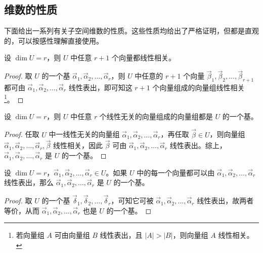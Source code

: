 \subsection{维数的性质}

下面给出一系列有关子空间维数的性质。这些性质均给出了严格证明，但都是直观的，可以按感性理解直接使用。

\begin{theorem}
	设 $\dim U = r$，则 $U$ 中任意 $r + 1$ 个向量都线性相关。
\end{theorem}

\begin{proof}
	取 $U$ 的一个基 $\vec \alpha_1, \vec \alpha_2, \ldots, \vec \alpha_r$，则 $U$ 中任意的 $r + 1$ 个向量 $\vec \beta_1, \vec \beta_2, \ldots, \vec \beta_{r + 1}$ 都可由 $\vec \alpha_1, \vec \alpha_2, \ldots, \vec \alpha_r$ 线性表出，即可知这 $r + 1$ 个向量组成的向量组线性相关\footnote{若向量组 $A$ 可由向量组 $B$ 线性表出，且 $|A| > |B|$，则向量组 $A$ 线性相关。}。
\end{proof}

\begin{theorem}
	设 $\dim U = r$，则 $U$ 中任意 $r$ 个线性无关的向量组成的向量组都是 $U$ 的一个基。
\end{theorem}

\begin{proof}
	任取 $U$ 中一线性无关的向量组 $\vec \alpha_1, \vec \alpha_2, \ldots, \vec \alpha_r$，再任取 $\vec \beta \in U$，则向量组 $\vec \alpha_1, \vec \alpha_2, \ldots, \vec \alpha_r, \vec \beta$ 线性相关，因此 $\vec \beta$ 可由 $\vec \alpha_1, \vec \alpha_2, \ldots, \vec \alpha_r$ 线性表出。综上， $\vec \alpha_1, \vec \alpha_2, \ldots, \vec \alpha_r$ 是 $U$ 的一个基。
\end{proof}

\begin{theorem}
	设 $\dim U = r$，$\vec \alpha_1, \vec \alpha_2, \ldots, \vec \alpha_r \in U$。如果 $U$ 中的每一个向量都可以由 $\vec \alpha_1, \vec \alpha_2, \ldots, \vec \alpha_r$ 线性表出，那么 $\vec \alpha_1, \vec \alpha_2, \ldots, \vec \alpha_r$ 是 $U$ 的一个基。
\end{theorem}

\begin{proof}
	取 $U$ 的一个基 $\vec \delta_1, \vec \delta_2, \ldots, \vec \delta_r$，可知它可被 $\vec \alpha_1, \vec \alpha_2, \ldots, \vec \alpha_r$ 线性表出，故两者等价，从而 $\vec \alpha_1, \vec \alpha_2, \ldots, \vec \alpha_r$ 也是 $U$ 的一个基。
\end{proof}

